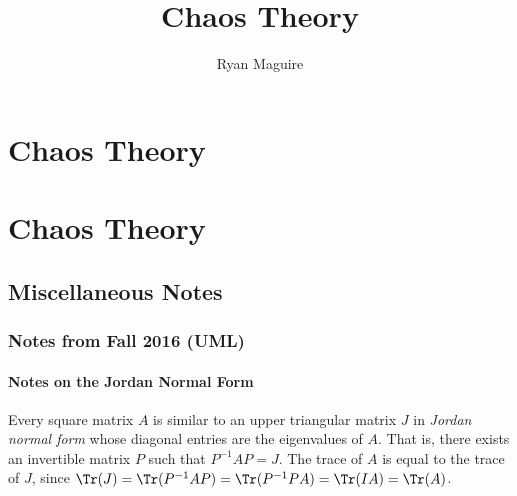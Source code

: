 \documentclass[crop=false,class=book,oneside]{standalone}
\begin{document}
    \ifx\ifmathcourses\undefined
        \title{Chaos Theory}
        \author{Ryan Maguire}
        \date{\vspace{-5ex}}
        \maketitle
        \tableofcontents
        \chapter*{Chaos Theory}
        \setcounter{chapter}{1}
    \else
        \chapter{Chaos Theory}
    \fi
    \section{Miscellaneous Notes}
        \subsection{Notes from Fall 2016 (UML)}
            \subsubsection{Notes on the Jordan Normal Form}
                Every square matrix $A$ is similar to an upper
                triangular matrix $J$ in
                \textit{Jordan normal form} whose diagonal entries
                are the eigenvalues of $A$. That is, there exists
                an invertible matrix $P$ such that
                $P^{-1}AP=J$. The trace of $A$ is equal to the
                trace of $J$, since
                $\Tr(J)=\Tr(P^{-1}AP)=\Tr(P^{-1}PA)=\Tr(IA)=\Tr(A)$.
\end{document}
